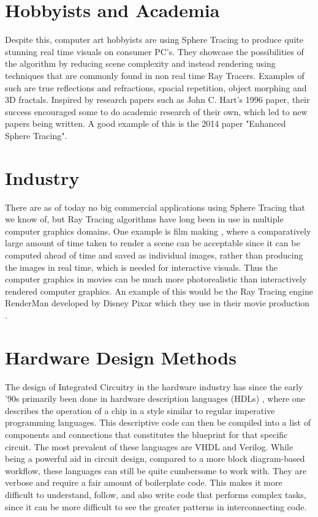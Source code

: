 	\section{ Hobbyists and Academia }

		Despite this, computer art hobbyists are using Sphere Tracing to
		produce quite stunning real time visuals on consumer PC's. They
		showcase the possibilities of the algorithm by reducing scene
		complexity and instead rendering using techniques that are commonly
		found in non real time Ray Tracers. Examples of such are true
		reflections and refractions, spacial repetition, object morphing and 3D
		fractals\cite{InigoQuilez}.  Inspired by research papers such as John
		C. Hart's 1996 paper\cite{Hart1996}, their success encouraged some
		to do academic research of their own, which led to new papers being
		written. A good example of this is the 2014 paper "Enhanced Sphere
		Tracing"\cite{Korndorfer2014}.

	\section{ Industry }		

		There are as of today no big commercial applications using Sphere
		Tracing that we know of, but Ray Tracing algorithms have long been in
		use in multiple computer graphics domains. One example is film
		making \cite{Christensen2006}, where a comparatively large amount of
		time taken to render a scene can be acceptable since it can be computed
		ahead of time and saved as individual images, rather than producing
		the images in real time, which is needed for interactive visuals.
		Thus the computer graphics in movies can be much more photorealistic
		than interactively rendered computer graphics. An example of this
		would be the Ray Tracing engine RenderMan developed by Disney Pixar
		which they use in their movie production \cite{Christensen2006}.

	\section{ Hardware Design Methods } 
	
		The design of Integrated Circuitry in the hardware industry has since
		the early '90s primarily been done in hardware description languages
		(HDLs) \cite{Chen2012}, where one describes the operation of a chip in a
		style similar to regular imperative programming languages. This
		descriptive code can then be compiled into a list of components and
		connections that constitutes the blueprint for that specific circuit.
		The most prevalent of these languages are VHDL and 
		Verilog\cite{Chen2012}. While being a powerful aid in circuit design,
		compared to a more block diagram-based workflow\cite{Lauwereins2008},
		these languages can still be quite cumbersome to work with. They are
		verbose and require a fair amount of boilerplate code. This makes it
		more difficult to understand, follow, and also write code that
		performs complex tasks, since it can be more difficult to see the
		greater patterns in interconnecting code.
		
